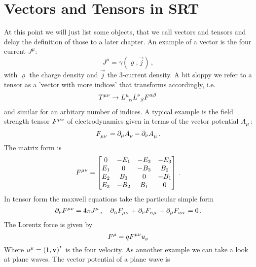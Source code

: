 \section{Vectors and Tensors in SRT}
At this point we will just list some objects, that we call vectors and tensors
and delay the definition of those to a later chapter.
An example of a vector is the four current $J^\mu$:
\begin{equation}
    J^\mu=\gamma(\varrho,\vec{j})\, ,
\end{equation}
with $\varrho$ the charge density and $\vec{j}$ the 3-current density. A bit sloppy
we refer to a tensor as a 'vector with more indices' that transforms
accordingly, i.e.
\begin{equation}
    \tensor{T}{^\mu^\nu}\to
    \tensor{L}{^\mu_\alpha}\tensor{L}{^\nu_\beta}\tensor{F}{^\alpha^\beta}\,
\end{equation}
and similar for an arbitary number of indices. A typical example is the field strength tensor
$\tensor{F}{^\mu^\nu}$ of electrodynamics given in terms of the
vector potential $\tensor{A}{_\mu}$:
\begin{equation}
    \tensor{F}{_\mu_\nu}=\partial_\mu\tensor{A}{_\nu}-\partial_\nu\tensor{A}{_\mu}\,
    .
\end{equation}
The matrix form is
\begin{equation}
    \tensor{F}{^\mu^\nu}=
    \begin{bmatrix}
        0  &   -E_1 &  -E_2 &  -E_3 \\
        E_1 &   0  &  -B_3 & B_2 \\
        E_2 & B_3 &   0  &  -B_1 \\
        E_3 &  -B_2 & B_1 &   0  \\
    \end{bmatrix}\, .
\end{equation}
In tensor form the maxwell equations take the particular simple form
\begin{equation}
    \partial_\nu\tensor{F}{^\mu^\nu}=4\pi\tensor{J}{^\mu}\,, \quad
    \partial_\alpha\tensor{F}{_\mu_\nu}
    +\partial_\nu\tensor{F}{_\alpha_\mu}
    +\partial_\mu\tensor{F}{_\nu_\alpha}=0\,.
\end{equation}
The Lorentz force is given by
\begin{equation}
    \tensor{F}{^\mu}=q\tensor{F}{^\mu^\nu}\tensor{u}{_\nu}
\end{equation}
Where $\tensor{u}{^\mu}=(1,\vec{v})\transpose$ is the four velocity. As
annother example we can take a look at plane waves. The vector potential of a plane wave is
